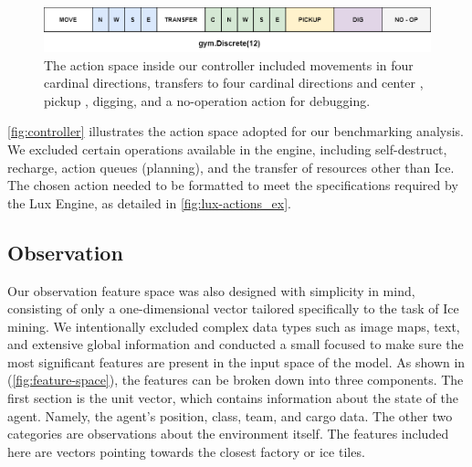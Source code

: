 \begin{figure}[htbp]
    \centering
    \includegraphics[width=1\linewidth]{images/methods_singleunit/action/controller.png}
    \captionsetup{justification=justified, singlelinecheck=false, width=1\linewidth, labelfont=bf} 
    \caption[]{The action space inside our controller included movements in four cardinal directions, transfers to four cardinal directions and center \protect\footnotemark, pickup \protect\footnotemark, digging, and a no-operation action for debugging.}
    \label{fig:controller}
\end{figure}


\noindent \textcolor{deepblue}{\autoref{fig:controller}} illustrates the action space adopted for our benchmarking analysis. We excluded certain operations available in the engine, including self-destruct, recharge, action queues (planning), and the transfer of resources other than Ice. The chosen action needed to be formatted to meet the specifications required by the Lux Engine, as detailed in \textcolor{deepblue}{\autoref{fig:lux-actions_ex}}.

\subsection{Observation}
\label{subsec:single-observation}

\noindent Our observation feature space was also designed with simplicity in mind, consisting of only a one-dimensional vector tailored specifically to the task of Ice mining. We intentionally excluded complex data types such as image maps, text, and extensive global information and conducted a small focused  to make sure the most significant features are present in the input space of the model. As shown in (\textcolor{deepblue}{\autoref{fig:feature-space}}), the features can be broken down into three components. The first section is the unit vector, which contains information about the state of the agent. Namely, the agent's position, class, team, and cargo data. The other two categories are observations about the environment itself. The features included here are vectors pointing towards the closest factory or ice tiles.

